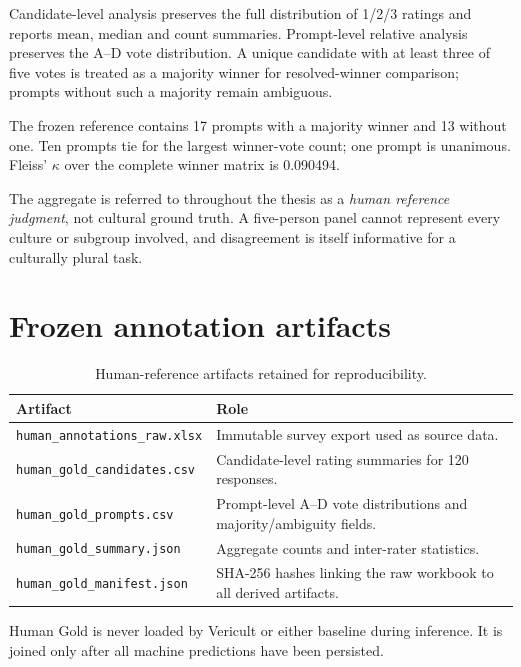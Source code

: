 Candidate-level analysis preserves the full distribution of 1/2/3 ratings and reports mean, median and count summaries. Prompt-level relative analysis preserves the A--D vote distribution. A unique candidate with at least three of five votes is treated as a majority winner for resolved-winner comparison; prompts without such a majority remain ambiguous.

The frozen reference contains 17 prompts with a majority winner and 13 without one. Ten prompts tie for the largest winner-vote count; one prompt is unanimous. Fleiss' $\kappa$ over the complete winner matrix is 0.090494.

The aggregate is referred to throughout the thesis as a \emph{human reference judgment}, not cultural ground truth. A five-person panel cannot represent every culture or subgroup involved, and disagreement is itself informative for a culturally plural task.

\section*{Frozen annotation artifacts}

\begin{table}[htbp]
\centering
\footnotesize
\caption{Human-reference artifacts retained for reproducibility.}
\label{tab:annotation-artifacts}
\begin{tabularx}{\textwidth}{p{4.2cm}X}
\toprule
\textbf{Artifact} & \textbf{Role} \\
\midrule
\texttt{human\_annotations\_raw.xlsx} & Immutable survey export used as source data. \\
\texttt{human\_gold\_candidates.csv} & Candidate-level rating summaries for 120 responses. \\
\texttt{human\_gold\_prompts.csv} & Prompt-level A--D vote distributions and majority/ambiguity fields. \\
\texttt{human\_gold\_summary.json} & Aggregate counts and inter-rater statistics. \\
\texttt{human\_gold\_manifest.json} & SHA-256 hashes linking the raw workbook to all derived artifacts. \\
\bottomrule
\end{tabularx}
\end{table}

Human Gold is never loaded by Vericult or either baseline during inference. It is joined only after all machine predictions have been persisted.
